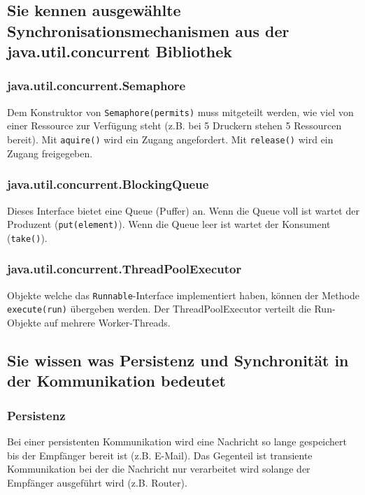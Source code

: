 \subsection{Sie kennen ausgewählte Synchronisationsmechanismen aus der java.util.concurrent Bibliothek}

\subsubsection{java.util.concurrent.Semaphore}

Dem Konstruktor von \texttt{Semaphore(permits)} muss mitgeteilt werden, wie viel von einer Ressource zur Verfügung steht (z.B. bei 5 Druckern stehen 5 Ressourcen bereit). Mit \texttt{aquire()} wird ein Zugang angefordert. Mit \texttt{release()} wird ein Zugang freigegeben.

\subsubsection{java.util.concurrent.BlockingQueue}

Dieses Interface bietet eine Queue (Puffer) an. Wenn die Queue voll ist wartet der Produzent (\texttt{put(element)}). Wenn die Queue leer ist wartet der Konsument (\texttt{take()}).

\subsubsection{java.util.concurrent.ThreadPoolExecutor}

Objekte welche das \texttt{Runnable}-Interface implementiert haben, können der Methode \texttt{execute(run)} übergeben werden. Der ThreadPoolExecutor verteilt die Run-Objekte auf mehrere Worker-Threads. 

\subsection{Sie wissen was Persistenz und Synchronität in der Kommunikation bedeutet}

\subsubsection{Persistenz}

Bei einer persistenten Kommunikation wird eine Nachricht so lange gespeichert bis der Empfänger bereit ist (z.B. E-Mail). Das Gegenteil ist transiente Kommunikation bei der die Nachricht nur verarbeitet wird solange der Empfänger ausgeführt wird (z.B. Router). 

